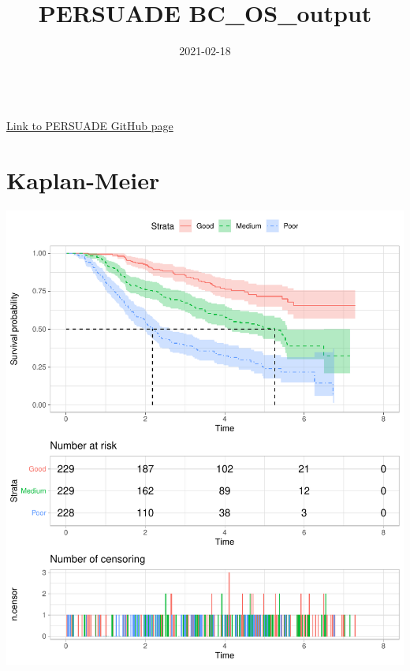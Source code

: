 \documentclass[]{article}
\title{PERSUADE BC\_OS\_output}
\author{}
\date{\vspace{-2.5em}2021-02-18}
\begin{document}
\maketitle

{
\hypersetup{linkcolor=black}
\setcounter{tocdepth}{2}
\tableofcontents
}
~\\
\href{https://github.com/Bram-R/PERSUADE}{Link to PERSUADE GitHub page}
\newpage

\section{Kaplan-Meier}\label{kaplan-meier}

\begin{flushleft}\includegraphics{Images/plot_KM-1} \end{flushleft}
\end{document}
